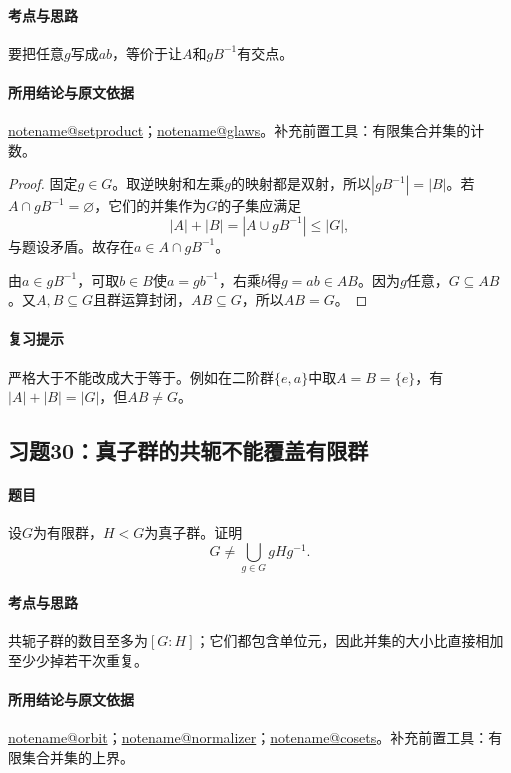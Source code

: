 \documentclass[UTF8,a4paper,11pt,fontset=windows]{ctexart}
\makeatletter
\newcommand{\noteref}[1]{\hyperref[note:#1]{\csname notename@#1\endcsname}}
\newcommand{\exref}[2]{\hyperref[ex:#1:#2]{第#1章习题#2}}
\makeatother
\begin{document}
\paragraph{考点与思路}
要把任意$g$写成$ab$，等价于让$A$和$gB^{-1}$有交点。

\paragraph{所用结论与原文依据}
\noteref{setproduct}；\noteref{glaws}。补充前置工具：有限集合并集的计数。


\begin{proof}
固定$g\in G$。取逆映射和左乘$g$的映射都是双射，所以$|gB^{-1}|=|B|$。若$A\cap gB^{-1}=\varnothing$，它们的并集作为$G$的子集应满足
\[
|A|+|B|=|A\cup gB^{-1}|\le|G|,
\]
与题设矛盾。故存在$a\in A\cap gB^{-1}$。

由$a\in gB^{-1}$，可取$b\in B$使$a=gb^{-1}$，右乘$b$得$g=ab\in AB$。因为$g$任意，$G\subseteq AB$。又$A,B\subseteq G$且群运算封闭，$AB\subseteq G$，所以$AB=G$。
\end{proof}

\paragraph{复习提示}
严格大于不能改成大于等于。例如在二阶群$\{e,a\}$中取$A=B=\{e\}$，有$|A|+|B|=|G|$，但$AB\ne G$。


\subsection{习题30：\texorpdfstring{真子群的共轭不能覆盖有限群}{真子群的共轭不能覆盖有限群}}
\label{ex:2:30}

\paragraph{题目}
设$G$为有限群，$H<G$为真子群。证明
\[
G\ne\bigcup_{g\in G}gHg^{-1}.
\]

\paragraph{考点与思路}
共轭子群的数目至多为$[G:H]$；它们都包含单位元，因此并集的大小比直接相加至少少掉若干次重复。

\paragraph{所用结论与原文依据}
\noteref{orbit}；\noteref{normalizer}；\noteref{cosets}。补充前置工具：有限集合并集的上界。
\end{document}
